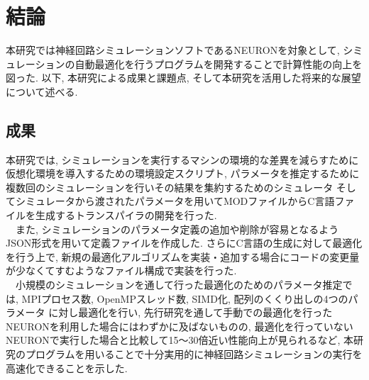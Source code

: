 \section{結論}
本研究では神経回路シミュレーションソフトであるNEURONを対象として,
シミュレーションの自動最適化を行うプログラムを開発することで計算性能の向上を図った.
以下, 本研究による成果と課題点, そして本研究を活用した将来的な展望について述べる.\\

\subsection{成果}
本研究では, シミュレーションを実行するマシンの環境的な差異を減らすために仮想化環境を導入するための環境設定スクリプト,
パラメータを推定するために複数回のシミュレーションを行いその結果を集約するためのシミュレータ
そしてシミュレータから渡されたパラメータを用いてMODファイルからC言語ファイルを生成するトランスパイラの開発を行った.\\
　また, シミュレーションのパラメータ定義の追加や削除が容易となるようJSON形式を用いて定義ファイルを作成した.
さらにC言語の生成に対して最適化を行う上で, 新規の最適化アルゴリズムを実装・追加する場合にコードの変更量が少なくてすむようなファイル構成で実装を行った.\\
　小規模のシミュレーションを通して行った最適化のためのパラメータ推定では, MPIプロセス数, OpenMPスレッド数, SIMD化, 配列のくくり出しの4つのパラメータ
に対し最適化を行い, 先行研究を通して手動での最適化を行ったNEURONを利用した場合にはわずかに及ばないものの,
最適化を行っていないNEURONで実行した場合と比較して15〜30倍近い性能向上が見られるなど,
本研究のプログラムを用いることで十分実用的に神経回路シミュレーションの実行を高速化できることを示した.\\

